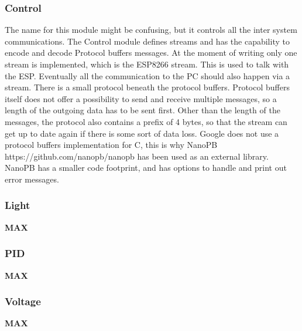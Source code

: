 \subsubsection{Control}
The name for this module might be confusing, but it controls all the inter system communications. The Control module defines streams and has the capability to encode and decode Protocol buffers messages. At the moment of writing only one stream is implemented, which is the ESP8266 stream. This is used to talk with the ESP. Eventually all the communication to the PC should also happen via a stream. There is a small protocol beneath the protocol buffers. Protocol buffers itself does not offer a possibility to send and receive multiple messages, so a length of the outgoing data has to be sent first. Other than the length of the messages, the protocol also contains a prefix of 4 bytes, so that the stream can get up to date again if there is some sort of data loss. Google does not use a protocol buffers implementation for C, this is why NanoPB https://github.com/nanopb/nanopb has been used as an external library. NanoPB has a smaller code footprint, and has options to handle and print out error messages.
\subsubsection{Light}
\textbf{MAX}
\subsubsection{PID}
\textbf{MAX}
\subsubsection{Voltage}
\textbf{MAX}

